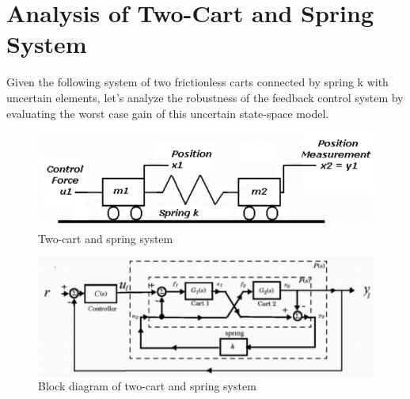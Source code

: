 \documentclass{article}[12pt]
\begin{document}
\section{Analysis of Two-Cart and Spring System}
Given \cite{MatlabRobust} the following system of two frictionless carts connected by spring k with uncertain elements, let's analyze the robustness of the feedback control system by evaluating the worst case gain of this uncertain state-space model.
\begin{figure} [H]
    \centering
    \includegraphics[scale=.5]{figures/2cart.png}
    \caption{Two-cart and spring system}
    \label{fig:2cart}
\end{figure}
\begin{figure} [H]
    \centering
    \includegraphics[scale=.3]{figures/block2cart.png}
    \caption{Block diagram of two-cart and spring system}
    \label{fig:block2cart}
\end{figure}
\end{document}
